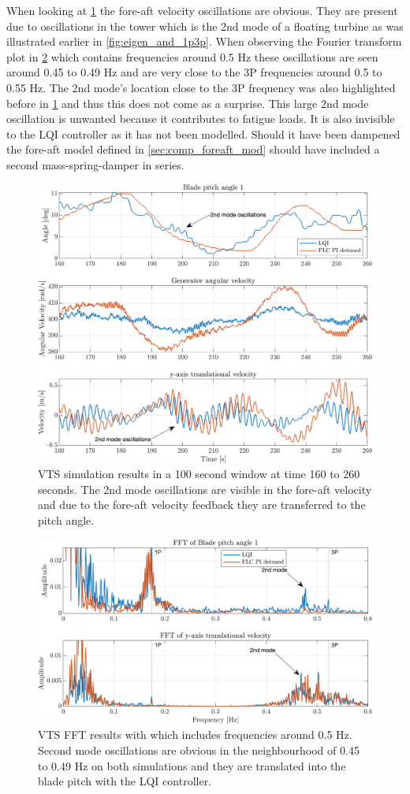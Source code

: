 \clearpage \newpage
When looking at \cref{fig:vts_12_zoom_th_w_py_vy} the fore-aft velocity oscillations are obvious. They are present due to oscillations in the tower which is the 2nd mode of a floating turbine as was illustrated earlier in \cref{fig:eigen_and_1p3p}. When observing the Fourier transform plot in \cref{fig:vts_13_zoom_fft_th_w_py_vy} which contains frequencies around 0.5 Hz these oscillations are seen around 0.45 to 0.49 Hz and are very close to the 3P frequencies around 0.5 to 0.55 Hz. The 2nd mode's location close to the 3P frequency was also highlighted before in \cref{fig:vts_12_zoom_th_w_py_vy} and thus this does not come as a surprise. This large 2nd mode oscillation is unwanted because it contributes to fatigue loads. It is also invisible to the LQI controller as it has not been modelled. Should it have been dampened the fore-aft model defined in \cref{sec:comp_foreaft_mod} should have included a second mass-spring-damper in series.
\begin{figure}[ht]
	\centering
	\includegraphics[width=0.7\linewidth]{Graphics/TestResults/VTSplotting/12_zoom_th_w_vy.png}
	\caption{VTS simulation results in a 100 second window at time 160 to 260 seconds. The 2nd mode oscillations are visible in the fore-aft velocity and due to the fore-aft velocity feedback they are transferred to the pitch angle.}
	\label{fig:vts_12_zoom_th_w_py_vy}
\end{figure}
\begin{figure}[ht]
	\centering
	\includegraphics[width=0.7\linewidth]{Graphics/TestResults/VTSplotting/13_zoom_fft_th_vy.png}
	\caption{VTS FFT results with which includes frequencies around 0.5 Hz. Second mode oscillations are obvious in the neighbourhood of 0.45 to 0.49 Hz on both simulations and they are translated into the blade pitch with the LQI controller.}
	\label{fig:vts_13_zoom_fft_th_w_py_vy}
\end{figure}

